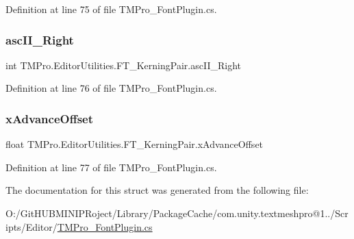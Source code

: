 Definition at line 75 of file T\+M\+Pro\+\_\+\+Font\+Plugin.\+cs.

\mbox{\label{struct_t_m_pro_1_1_editor_utilities_1_1_f_t___kerning_pair_a917af5004a15b2f456763cdb17555440}} 
\subsubsection{\texorpdfstring{ascII\_Right}{ascII\_Right}}
{\footnotesize\ttfamily int T\+M\+Pro.\+Editor\+Utilities.\+F\+T\+\_\+\+Kerning\+Pair.\+asc\+I\+I\+\_\+\+Right}



Definition at line 76 of file T\+M\+Pro\+\_\+\+Font\+Plugin.\+cs.

\mbox{\label{struct_t_m_pro_1_1_editor_utilities_1_1_f_t___kerning_pair_ab863a45dc98811ed5f56920b44d44ec3}} 
\subsubsection{\texorpdfstring{xAdvanceOffset}{xAdvanceOffset}}
{\footnotesize\ttfamily float T\+M\+Pro.\+Editor\+Utilities.\+F\+T\+\_\+\+Kerning\+Pair.\+x\+Advance\+Offset}



Definition at line 77 of file T\+M\+Pro\+\_\+\+Font\+Plugin.\+cs.



The documentation for this struct was generated from the following file\+:\begin{DoxyCompactItemize}
\item 
O\+:/\+Git\+H\+U\+B\+M\+I\+N\+I\+P\+Roject/\+Library/\+Package\+Cache/com.\+unity.\+textmeshpro@1../\+Scripts/\+Editor/\mbox{\hyperlink{_t_m_pro___font_plugin_8cs}{T\+M\+Pro\+\_\+\+Font\+Plugin.\+cs}}\end{DoxyCompactItemize}
